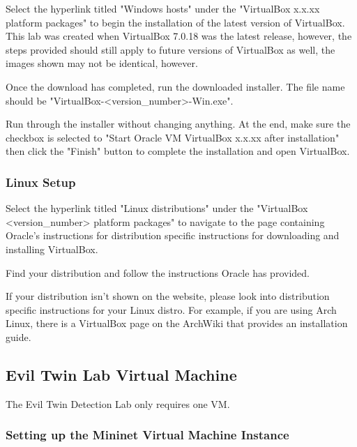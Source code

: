 \documentclass[letterpaper,12pt]{report}
\begin{document}
Select the hyperlink titled "Windows hosts" under the "VirtualBox x.x.xx platform packages" to begin the installation of the latest version of VirtualBox. This lab was created when VirtualBox 7.0.18 was the latest release, however, the steps provided should still apply to future versions of VirtualBox as well, the images shown may not be identical, however.

Once the download has completed, run the downloaded installer. The file name should be "VirtualBox-<version\_number>-Win.exe".

Run through the installer without changing anything. At the end, make sure the checkbox is selected to "Start Oracle VM VirtualBox x.x.xx after installation" then click the "Finish" button to complete the installation and open VirtualBox.

\subsubsection*{Linux Setup}\label{sec:Virtual-Machine-Linux-Setup}

Select the hyperlink titled "Linux distributions" under the "VirtualBox <version\_number> platform packages" to navigate to the page containing Oracle's instructions for distribution specific instructions for downloading and installing VirtualBox.

Find your distribution and follow the instructions Oracle has provided.

If your distribution isn't shown on the website, please look into distribution specific instructions for your Linux distro. For example, if you are using Arch Linux, there is a VirtualBox page on the ArchWiki that provides an installation guide.

\subsection*{Evil Twin Lab Virtual Machine}\label{sec:Evil-Twin-Lab-Virtual-Machine}

The Evil Twin Detection Lab only requires one VM.

\subsubsection*{Setting up the Mininet Virtual Machine Instance}\label{sec:Virtual-Machine-Setting-up-the-Mininet-Virtual-Machine-Instance}
\end{document}
